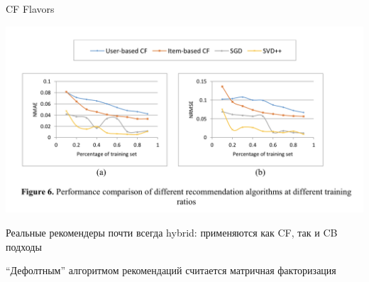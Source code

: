 \documentclass[11pt,aspectratio=169,handout]{beamer}
\begin{document}
\begin{frame}{CF Flavors}

\begin{center}
\includegraphics[scale=0.5]{images/comparison.png}
\end{center}

\end{frame}

\begin{frame}

\begin{tcolorbox}[colback=info!5,colframe=info!80,title=]
Реальные рекомендеры почти всегда hybrid: применяются как CF, так и CB подходы
\end{tcolorbox}

\begin{tcolorbox}[colback=info!5,colframe=info!80,title=]
``Дефолтным'' алгоритмом рекомендаций считается матричная факторизация
\end{tcolorbox}

\end{frame}
\end{document}
